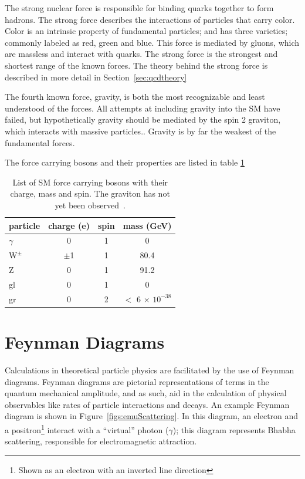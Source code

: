 The strong nuclear force is responsible for binding quarks together to form hadrons.  
The strong force describes the interactions of particles that carry color.  
Color is an intrinsic property of fundamental particles; and has three varieties; commonly labeled as red, green and blue.
This force is mediated by gluons, which are massless and interact with quarks.  
The strong force is the strongest and shortest range of the known forces.  
The theory behind the strong force is described in more detail in Section~\ref{sec:qcdtheory}

The fourth known force, gravity, is both the most recognizable and least understood of the forces.  
All attempts at including gravity into the SM have failed, but hypothetically gravity should be mediated by the spin 2 graviton, which interacts with massive particles..
Gravity is by far the weakest of the fundamental forces. 

The force carrying bosons and their properties are listed in table \ref{table:SMbos}


\begin{table}
\begin{center}
\begin{tabular}{l|c|c|c}
\hline
\hline
particle & charge (e) & spin & mass (GeV)\\ \hline \hline
$\gamma$  & 0 & 1 & 0\\ 
$\mathrm{W^{\pm}}$ & $\pm$1 & 1 & 80.4\\
Z & 0 & 1 & 91.2\\ 
gl & 0 & 1 & 0 \\ 
gr & 0 & 2 & $<$ 6 $\times$ $\mathrm{10^{-38}}$ \\ 
\hline
\end{tabular}
\end{center}
\caption{List of SM force carrying bosons with their charge, mass and spin.  The graviton has not yet been observed~\cite{PDG-2014}.}
\label{table:SMbos}
\end{table}


\section{Feynman Diagrams}
Calculations in theoretical particle physics are facilitated by the use of Feynman diagrams.  
Feynman diagrams are pictorial representations of terms in the quantum mechanical amplitude, and as such, aid in the calculation of physical 
observables like rates of particle interactions and decays.  
An example Feynman diagram is shown in Figure~\ref{figs:emuScattering}.  
In this diagram, an electron and a positron\footnote{Shown as an electron with an inverted line direction} interact with a ``virtual'' photon ($\gamma$); 
this diagram represents Bhabha scattering, responsible for electromagnetic attraction.  

